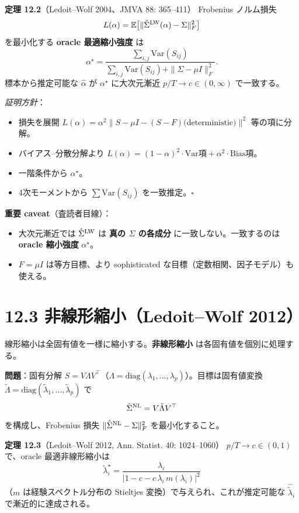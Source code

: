 \documentclass[11pt,a4paper]{report}
\begin{document}
\textbf{定理 12.2}（Ledoit–Wolf 2004、JMVA 88: 365–411） Frobenius ノルム損失 \[ L(\alpha) = \mathbb{E}\bigl[ \| \hat\Sigma^{\rm LW}(\alpha) - \Sigma \|_F^2 \bigr] \] を最小化する \textbf{oracle 最適縮小強度} は \[ \alpha^\star = \frac{\sum_{i,j} \mathrm{Var}(S_{ij})}{\sum_{i,j} \mathrm{Var}(S_{ij}) + \| \Sigma - \mu I \|_F^2}. \] 標本から推定可能な $\hat\alpha$ が $\alpha^\star$ に大次元漸近 $p/T \to c \in (0,\infty)$ で一致する。

\emph{証明方針}：
\begin{itemize}
\item 損失を展開 $L(\alpha) = \alpha^2 \|S - \mu I - (S - F)\text{(deterministic)}\|^2$ 等の項に分解。
\item バイアス–分散分解より $L(\alpha) = (1-\alpha)^2 \cdot \mathrm{Var}\text{項} + \alpha^2 \cdot \mathrm{Bias}\text{項}$。
\item 一階条件から $\alpha^\star$。
\item 4次モーメントから $\sum \mathrm{Var}(S_{ij})$ を一致推定。$\square$
\end{itemize}

\textbf{重要 caveat}（査読者目線）：
\begin{itemize}
\item 大次元漸近では $\hat\Sigma^{\rm LW}$ は \textbf{真の $\Sigma$ の各成分} に一致しない。一致するのは \textbf{oracle 縮小強度} $\alpha^\star$。
\item $F = \mu I$ は等方目標、より sophisticated な目標（定数相関、因子モデル）も使える。
\end{itemize}

\section{12.3 非線形縮小（Ledoit–Wolf 2012）}

線形縮小は全固有値を一様に縮小する。\textbf{非線形縮小} は各固有値を個別に処理する。

\textbf{問題}：固有分解 $S = V \Lambda V^\top$（$\Lambda = \mathrm{diag}(\lambda_1, \dots, \lambda_p)$）。目標は固有値変換 $\tilde\Lambda = \mathrm{diag}(\tilde\lambda_1, \dots, \tilde\lambda_p)$ で \[ \hat\Sigma^{\rm NL} = V \tilde\Lambda V^\top \] を構成し、Frobenius 損失 $\|\hat\Sigma^{\rm NL} - \Sigma\|_F^2$ を最小化すること。

\textbf{定理 12.3}（Ledoit–Wolf 2012, Ann. Statist. 40: 1024–1060） $p/T \to c \in (0, 1)$ で、oracle 最適非線形縮小は \[ \tilde\lambda_i^\star = \frac{\lambda_i}{|1 - c - c\, \lambda_i\, m(\lambda_i)|^2} \] （$m$ は経験スペクトル分布の Stieltjes 変換）で与えられ、これが推定可能な $\hat{\tilde\lambda}_i$ で漸近的に達成される。
\end{document}
